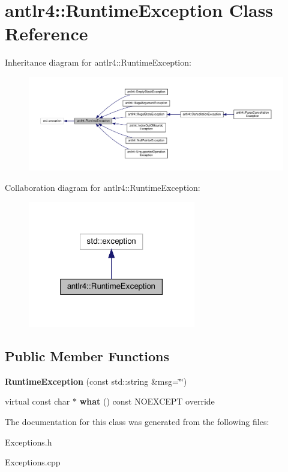 \hypertarget{classantlr4_1_1RuntimeException}{}\section{antlr4\+:\+:Runtime\+Exception Class Reference}
\label{classantlr4_1_1RuntimeException}


Inheritance diagram for antlr4\+:\+:Runtime\+Exception\+:
\nopagebreak
\begin{figure}[H]
\begin{center}
\leavevmode
\includegraphics[width=350pt]{classantlr4_1_1RuntimeException__inherit__graph}
\end{center}
\end{figure}


Collaboration diagram for antlr4\+:\+:Runtime\+Exception\+:
\nopagebreak
\begin{figure}[H]
\begin{center}
\leavevmode
\includegraphics[width=207pt]{classantlr4_1_1RuntimeException__coll__graph}
\end{center}
\end{figure}
\subsection*{Public Member Functions}
\begin{DoxyCompactItemize}
\item 
\mbox{\label{classantlr4_1_1RuntimeException_a5b8568d3bd6974d6ea6f9ed1e3c4bf1c}} 
{\bfseries Runtime\+Exception} (const std\+::string \&msg=\char`\"{}\char`\"{})
\item 
\mbox{\label{classantlr4_1_1RuntimeException_aba5e7617c99c76178dabe0dec2c45f25}} 
virtual const char $\ast$ {\bfseries what} () const N\+O\+E\+X\+C\+E\+PT override
\end{DoxyCompactItemize}


The documentation for this class was generated from the following files\+:\begin{DoxyCompactItemize}
\item 
Exceptions.\+h\item 
Exceptions.\+cpp\end{DoxyCompactItemize}
